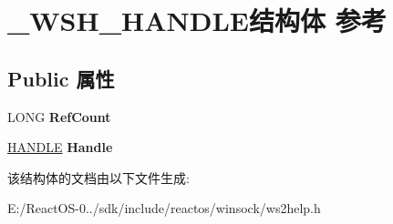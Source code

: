 \hypertarget{struct___w_s_h___h_a_n_d_l_e}{}\section{\+\_\+\+W\+S\+H\+\_\+\+H\+A\+N\+D\+L\+E结构体 参考}
\label{struct___w_s_h___h_a_n_d_l_e}
\subsection*{Public 属性}
\begin{DoxyCompactItemize}
\item 
\mbox{\label{struct___w_s_h___h_a_n_d_l_e_a6725162afe383090a46a115058e29b43}} 
L\+O\+NG {\bfseries Ref\+Count}
\item 
\mbox{\label{struct___w_s_h___h_a_n_d_l_e_afa3989e91edfd1a717fc70c9369141fd}} 
\hyperlink{interfacevoid}{H\+A\+N\+D\+LE} {\bfseries Handle}
\end{DoxyCompactItemize}


该结构体的文档由以下文件生成\+:\begin{DoxyCompactItemize}
\item 
E\+:/\+React\+O\+S-\/0../sdk/include/reactos/winsock/ws2help.\+h\end{DoxyCompactItemize}
